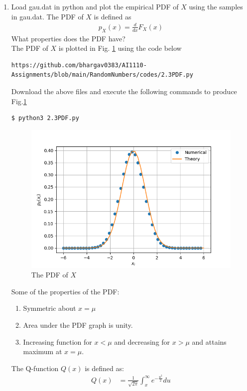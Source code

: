 \documentclass[journal,12pt,twocolumn]{IEEEtran}
\renewcommand\thesection{\arabic{section}}
\begin{document}
\begin{enumerate}[label=\thesection.\arabic*
,ref=\thesection.\theenumi]
\item
Load gau.dat in python and plot the empirical PDF of $X$ using the samples in gau.dat. The PDF of $X$ is defined as
\begin{align}
p_{X}(x) = \frac{d}{dx}F_{X}(x)
\end{align}
What properties does the PDF have?
\\
\solution The PDF of $X$ is plotted in Fig. \ref{fig:2.3} using the code below
\begin{lstlisting}
https://github.com/bhargav0383/AI1110-Assignments/blob/main/RandomNumbers/codes/2.3PDF.py
\end{lstlisting}
Download the above files and execute the following commands to produce Fig.\ref{fig:2.3}
\begin{lstlisting}
$ python3 2.3PDF.py
\end{lstlisting}
\begin{figure}[!h]
\centering
\includegraphics[width=\columnwidth]{./figs/2.3PDF.png}
\caption{The PDF of $X$}
\label{fig:2.3}
\end{figure}
Some of the properties of the PDF:
\begin{enumerate}
    \item Symmetric about $x=\mu$
    \item Area under the PDF graph is unity.
    \item Increasing function for $x<\mu$ and decreasing for $x>\mu$ and attains maximum at $x=\mu$.
\end{enumerate}
The Q-function $\displaystyle{Q(x)}$ is defined as:
\begin{align}
    \displaystyle{Q(x)} &= \frac{1}{\sqrt{2\pi}}\int_{x}^{\infty}e^{-\frac{u^2}{2}}du\\

\end{align}
\end{enumerate}
\end{document}

